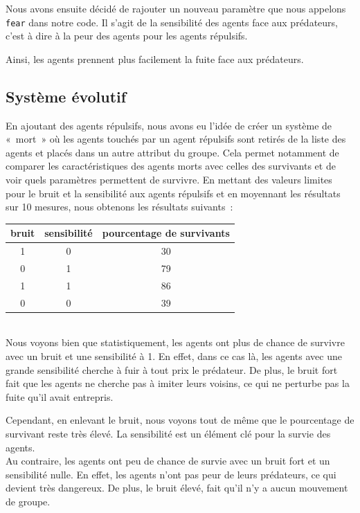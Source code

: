 \documentclass[french, a4paper, 12pt, openany]{report}
\begin{document}
   Nous avons ensuite décidé de rajouter un nouveau paramètre que nous appelons \verb|fear| dans notre code. Il s'agit de la sensibilité des agents face aux prédateurs, c'est à dire à la peur des agents pour les agents répulsifs. 
   
   Ainsi, les agents prennent plus facilement la fuite face aux prédateurs.      
   

	\subsection{Système évolutif}
	
		En ajoutant des agents répulsifs, nous avons eu l'idée de créer un système de «~mort~» où les agents touchés par un agent répulsifs sont retirés de la liste des agents et placés dans un autre attribut du groupe. Cela permet notamment de comparer les caractéristiques des agents morts avec celles des survivants et de voir quels paramètres permettent de survivre. En mettant des valeurs limites pour le bruit et la sensibilité aux agents répulsifs et en moyennant les résultats sur 10 mesures, nous obtenons les résultats suivants~:\\
		
		\begin{tabular}{|c|c|c|} \hline
		\centering
			bruit & sensibilité & pourcentage de survivants \\ \hline
			1 & 0 & 30 \\ \hline
			0 & 1 & 79 \\ \hline
			1 & 1 & 86 \\ \hline
			0 & 0 & 39 \\ \hline
		\end{tabular}\\

   Nous voyons bien que statistiquement, les agents ont plus de chance de survivre avec un bruit et une sensibilité à 1. En effet, dans ce cas là, les agents avec une grande sensibilité cherche à fuir à tout prix le prédateur. De plus, le bruit fort fait que les agents ne cherche pas à imiter leurs voisins, ce qui ne perturbe pas la fuite qu'il avait entrepris. 
   
   Cependant, en enlevant le bruit, nous voyons tout de même que le pourcentage de survivant reste très élevé. La sensibilité est un élément clé pour la survie des agents.\\

  Au contraire, les agents ont peu de chance de survie avec un bruit fort et un sensibilité nulle. En effet, les agents n'ont pas peur de leurs prédateurs, ce qui devient très dangereux. De plus, le bruit élevé, fait qu'il n'y a aucun mouvement de groupe.
  
\end{document}
